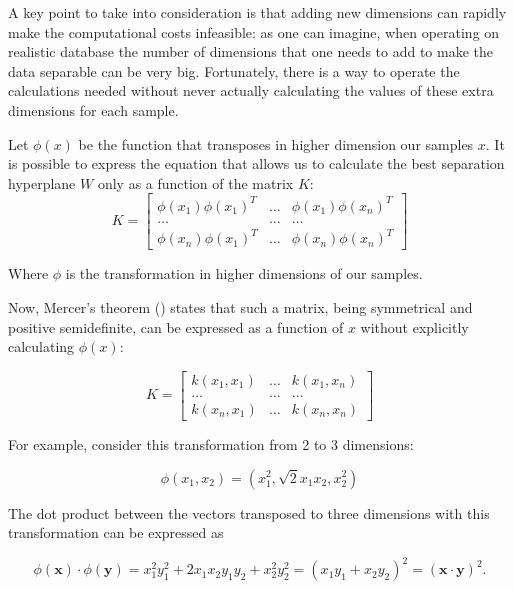 \documentclass[a4paper]{report}
\begin{document}
A key point to take into consideration is that adding new dimensions can rapidly make the computational costs infeasible: as one can imagine, when operating on realistic database the number of dimensions that one needs to add to make the data separable can be very big.
Fortunately, there is a way to operate the calculations needed without never actually calculating the values of these extra dimensions for each sample.

Let $\phi (x)$ be the function that transposes in higher dimension our samples $x$. It is possible to express the equation that allows us to calculate the best separation hyperplane $W$ only as a function of the matrix $K$:
\begin{equation}
	K =
	\begin{bmatrix}
		\phi (x_1) \phi(x_1)^T & \ldots & \phi (x_1) \phi(x_n)^T \\
		\ldots                 & \ldots & \ldots \\
		\phi (x_n) \phi(x_1)^T & \ldots & \phi (x_n) \phi(x_n)^T
	\end{bmatrix}
\end{equation}

Where $\phi$ is the transformation in higher dimensions of our samples.

Now, Mercer's theorem (\cite{campbell2002kernel}) states that such a matrix, being symmetrical and positive semidefinite, can be expressed as a function of $x$ without explicitly calculating $\phi (x)$:

\begin{equation}
	K =
	\begin{bmatrix}
		k(x_1, x_1) & \ldots & k(x_1, x_n) \\
		\ldots                 & \ldots & \ldots \\
		k(x_n, x_1) & \ldots & k(x_n, x_n)
	\end{bmatrix}
\end{equation}

For example, consider this transformation from 2 to 3 dimensions:

\begin{equation}
	\phi (x_1, x_2) = (x_1^2, \sqrt 2 x_1x_2, x_2^2)
\end{equation}

The dot product between the vectors transposed to three dimensions with this transformation can be expressed as

\begin{equation}
	\phi(\textbf{x}) \cdot \phi(\textbf{y}) = x_1^2y_1^2 + 2x_1x_2y_1y_2 + x_2^2y_2^2 = (x_1y_1+x_2y_2)^2 = (\textbf{x} \cdot \textbf{y})^2.
\end{equation}
\end{document}
